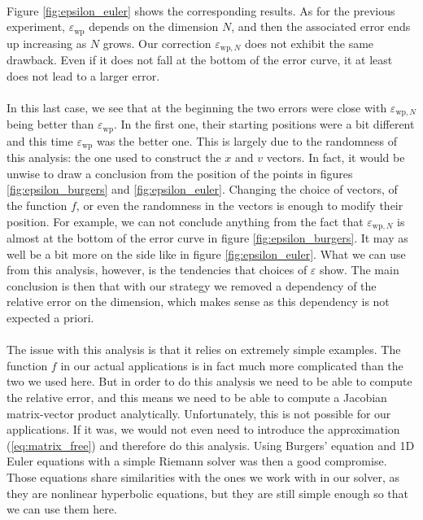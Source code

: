       \paragraph{}
      Figure \ref{fig:epsilon_euler} shows the corresponding results.
      As for the previous experiment, $\varepsilon_\textrm{wp}$ depends on the dimension $N$, and then the associated error ends up increasing as $N$ grows.
      Our correction $\varepsilon_{\textrm{wp}, N}$ does not exhibit the same drawback.
      Even if it does not fall at the bottom of the error curve, it at least does not lead to a larger error.

      \paragraph{}
      In this last case, we see that at the beginning the two errors were close with $\varepsilon_{\textrm{wp}, N}$ being better than $\varepsilon_\textrm{wp}$.
      In the first one, their starting positions were a bit different and this time $\varepsilon_\textrm{wp}$ was the better one.
      This is largely due to the randomness of this analysis: the one used to construct the $x$ and $v$ vectors.
      In fact, it would be unwise to draw a conclusion from the position of the points in figures \ref{fig:epsilon_burgers} and \ref{fig:epsilon_euler}.
      Changing the choice of vectors, of the function $f$, or even the randomness in the vectors is enough to modify their position.
      For example, we can not conclude anything from the fact that $\varepsilon_{\textrm{wp}, N}$ is almost at the bottom of the error curve in figure \ref{fig:epsilon_burgers}.
      It may as well be a bit more on the side like in figure \ref{fig:epsilon_euler}.
      What we can use from this analysis, however, is the tendencies that choices of $\varepsilon$ show.
      The main conclusion is then that with our strategy we removed a dependency of the relative error on the dimension, which makes sense as this dependency is not expected a priori.

      \paragraph{}
      The issue with this analysis is that it relies on extremely simple examples.
      The function $f$ in our actual applications is in fact much more complicated than the two we used here.
      But in order to do this analysis we need to be able to compute the relative error, and this means we need to be able to compute a Jacobian matrix-vector product analytically.
      Unfortunately, this is not possible for our applications.
      If it was, we would not even need to introduce the approximation (\ref{eq:matrix_free}) and therefore do this analysis.
      Using Burgers' equation and 1D Euler equations with a simple Riemann solver was then a good compromise.
      Those equations share similarities with the ones we work with in our solver, as they are nonlinear hyperbolic equations, but they are still simple enough so that we can use them here.



